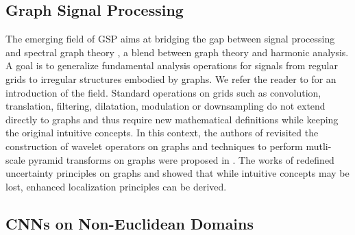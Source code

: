 \documentclass{article}
\begin{document}
\subsection{Graph Signal Processing}

The emerging field of GSP aims at bridging the gap between signal processing
and spectral graph theory \cite{book:Chung97Spectral,
art:BelkinNiyogi05LaplaBeltrami, art:VonLuxburg07Tutorial}, a blend between
graph theory and harmonic analysis. A goal is to generalize fundamental
analysis operations for signals from regular grids to irregular structures
embodied by graphs. We refer the reader to
\cite{art:ShumanNarangFrossardOrtegaVandergheynst13ReviewSPG} for an
introduction of the field.  Standard operations on grids such as convolution,
translation, filtering, dilatation, modulation or downsampling do not extend
directly to graphs and thus require new mathematical definitions while keeping
the original intuitive concepts. In this context, the authors of
\cite{art:HammondVandergheynstGribonval11GraphWav, art:CoifmanLafon06DifMap,
pro:GavishNadlerCoifman10GraphHaar} revisited the construction of wavelet
operators on graphs and techniques to perform mutli-scale pyramid transforms on
graphs were proposed in \cite{art:ShumanFarajiVandergheynst16PyramTrans,
art:RamEladCohen11TreeWavelets}. The works of
\cite{pro:TsitsveroBarbarossa15Uncert, pro:PasdeloupAlamiGriponRabbat15Uncert,
art:PerraudinRicaudShumanVandergheynst16Uncert} redefined uncertainty
principles on graphs and showed that while intuitive concepts may be lost,
enhanced localization principles can be derived.


\subsection{CNNs on Non-Euclidean Domains}

\end{document}
